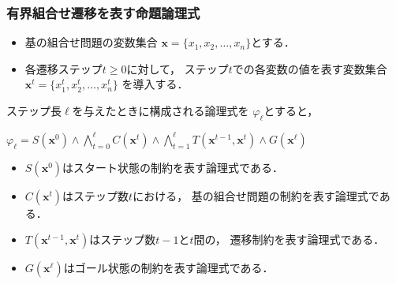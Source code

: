 \documentclass[dvipdfmx,11pt]{beamer}
\begin{document}
\begin{frame}\frametitle{有界組合せ遷移を表す命題論理式}

  \begin{itemize}
    \item 基の組合せ問題の変数集合
          $\bm{x} = \{x_1,x_2,\ldots,x_n\}$とする．
    \item 各遷移ステップ$t\geq 0$に対して，
          ステップ$t$での各変数の値を表す変数集合
          $\bm{x}^{t} = \{x_1^t,x_2^t,\ldots,x_n^t\}$
          を導入する．
  \end{itemize}

  ステップ長$\ell$を与えたときに構成される論理式を
  $\varphi_{\ell}$とすると，
  \begin{block}{}
    \centering
    $
      \varphi_{\ell} = S(\bm{x}^0)
      \land \bigwedge_{t=0}^{\ell} C(\bm{x}^t) 
      \land \bigwedge_{t=1}^{\ell} T(\bm{x}^{t-1},\bm{x}^{t})
      \land G(\bm{x}^\ell)
    $
  \end{block}

  \begin{itemize}
    \item $S(\bm{x}^0)$はスタート状態の制約を表す論理式である．
    \item $C(\bm{x}^t)$はステップ数$t$における，
          基の組合せ問題の制約を表す論理式である．
    \item $T(\bm{x}^{t-1},\bm{x}^{t})$はステップ数$t-1$と$t$間の，
          遷移制約を表す論理式である．
    \item $G(\bm{x}^\ell)$はゴール状態の制約を表す論理式である．
  \end{itemize}

\end{frame}
\end{document}
